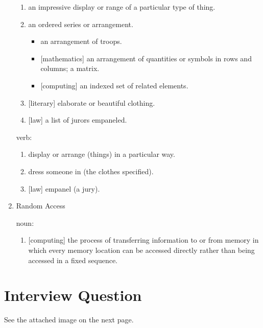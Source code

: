 \documentclass[12pt]{article}
\numberwithin{figure}{subsection}
\numberwithin{table}{subsection}
\numberwithin{equation}{subsection}
\begin{document}
\begin{enumerate}
  \begin{enumerate}
    \item an impressive display or range of a particular type of thing.

    \item an ordered series or arrangement.
      \begin{itemize}
        \item an arrangement of troops.
        \item {[mathematics]} an arrangement of quantities or symbols in rows and columns; a matrix.
        \item {[computing]} an indexed set of related elements.
      \end{itemize}

    \item {[literary]} elaborate or beautiful clothing.
    \item {[law]} a list of jurors empaneled.
  \end{enumerate}

  verb:

  \begin{enumerate}
    \item display or arrange (things) in a particular way.
    \item dress someone in (the clothes specified).
    \item {[law]} empanel (a jury).
  \end{enumerate}

  \item{Random Access}

  noun:

  \begin{enumerate}
    \item {[computing]} the process of transferring information to or from memory in which every memory location can be accessed directly rather than being accessed in a fixed sequence.
  \end{enumerate}
\end{enumerate}

\section{Interview Question}

See the attached image on the next page.
\end{document}
